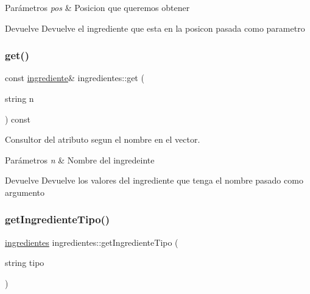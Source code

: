 \begin{DoxyParams}{Parámetros}
{\em pos} & Posicion que queremos obtener \\
\hline
\end{DoxyParams}
\begin{DoxyReturn}{Devuelve}
Devuelve el ingrediente que esta en la posicon pasada como parametro 
\end{DoxyReturn}
\mbox{\label{classingredientes_aae670bf5dc762313dff281c7c6aa1b4f}} 
\subsubsection{\texorpdfstring{get()}{get()}\hspace{0.1cm}{\footnotesize\ttfamily [2/2]}}
{\footnotesize\ttfamily const \hyperlink{classingrediente}{ingrediente}\& ingredientes\+::get (\begin{DoxyParamCaption}\item[{string}]{n }\end{DoxyParamCaption}) const}



Consultor del atributo segun el nombre en el vector. 


\begin{DoxyParams}{Parámetros}
{\em n} & Nombre del ingredeinte \\
\hline
\end{DoxyParams}
\begin{DoxyReturn}{Devuelve}
Devuelve los valores del ingrediente que tenga el nombre pasado como argumento 
\end{DoxyReturn}
\mbox{\label{classingredientes_a160ecb07facb16cbe7369ea797c67549}} 
\subsubsection{\texorpdfstring{get\+Ingrediente\+Tipo()}{getIngredienteTipo()}}
{\footnotesize\ttfamily \hyperlink{classingredientes}{ingredientes} ingredientes\+::get\+Ingrediente\+Tipo (\begin{DoxyParamCaption}\item[{string}]{tipo }\end{DoxyParamCaption})}



